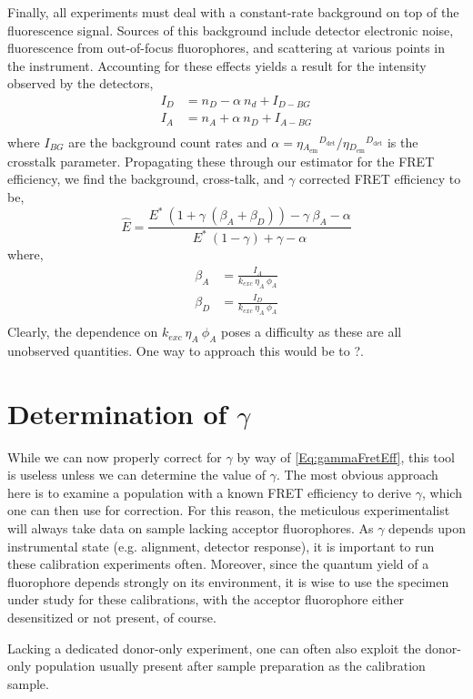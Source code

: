 \documentclass{article}
\newcommand{\emm}[1]{\ensuremath{_{#1_\mathrm{em}}}}   %
\newcommand{\dt}[1]{\ensuremath{^{#1_\mathrm{det}}}}   %
\begin{document}
Finally, all experiments must deal with a constant-rate
background on top of the fluorescence signal. Sources of this background
include detector electronic noise, fluorescence from out-of-focus
fluorophores, and scattering at various points in the instrument.
Accounting for these effects yields a result for the intensity
observed by the detectors,
\begin{align*}
  I_D & = n_D - \alpha~n_d + I_{D-BG} \\
  I_A & = n_A + \alpha~n_D + I_{A-BG} \\
\end{align*} 
where $I_{BG}$ are the background count rates and $\alpha =
\eta\emm{A}\dt{D} / \eta\emm{D}\dt{D}$ is the crosstalk
parameter. Propagating these through our estimator for the FRET
efficiency, we find the background, cross-talk, and $\gamma$ corrected
FRET efficiency to be,
\[
  \hat E = \frac{E^* ~ \left(1 + \gamma ~ (\beta_A + \beta_D)\right) - \gamma~\beta_A - \alpha}
    {E^* ~ (1 - \gamma) + \gamma - \alpha}
\]
where,
\begin{align*}
  \beta_A & = \frac{I_A}{k_{exc}~\eta_A~\phi_A} \\
  \beta_D & = \frac{I_D}{k_{exc}~\eta_A~\phi_A} \\
\end{align*}
Clearly, the dependence on $k_{exc}~\eta_A~\phi_A$ poses a difficulty
as these are all unobserved quantities. One way to approach this would
be to ?.

\section{Determination of $\gamma$}
While we can now properly correct for $\gamma$ by way of
\eqref{Eq:gammaFretEff}, this tool is useless unless we can determine
the value of $\gamma$. The most obvious approach here is to examine a
population with a known FRET efficiency to derive $\gamma$, which one
can then use for correction. For this reason, the meticulous
experimentalist will always take data on sample lacking acceptor
fluorophores. As $\gamma$ depends upon instrumental state
(e.g. alignment, detector response), it is important to run these
calibration experiments often. Moreover, since the quantum yield of a
fluorophore depends strongly on its environment, it is wise to use the
specimen under study for these calibrations, with the acceptor
fluorophore either desensitized or not present, of course.

Lacking a dedicated donor-only experiment, one can often also
exploit the donor-only population usually present after sample
preparation as the calibration sample.
\end{document}
